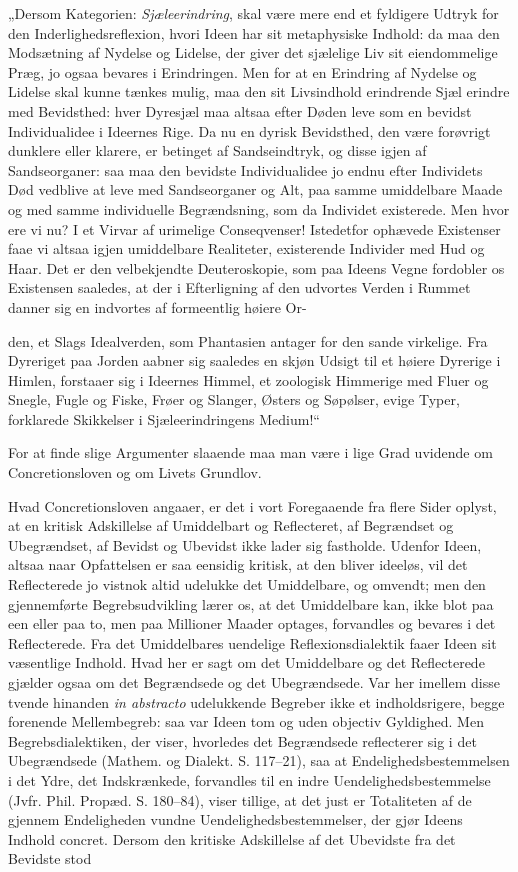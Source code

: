 \documentclass[12pt,a4paper]{book}
\begin{document}
„Dersom Kategorien: \emph{Sjæleerindring}, skal være mere end et fyldigere
Udtryk for den Inderlighedsreflexion, hvori Ideen har sit metaphysiske Indhold:
da maa den Modsætning af Nydelse og Lidelse, der giver det sjælelige Liv sit
eiendommelige Præg, jo ogsaa bevares i Erindringen. Men for at en Erindring af
Nydelse og Lidelse skal kunne tænkes mulig, maa den sit Livsindhold erindrende
Sjæl erindre med Bevidsthed: hver Dyresjæl maa altsaa efter Døden leve som en
bevidst Individualidee i Ideernes Rige. Da nu en dyrisk Bevidsthed, den være
forøvrigt dunklere eller klarere, er betinget af Sandseindtryk, og disse igjen
af Sandseorganer: saa maa den bevidste Individualidee jo endnu efter Individets
Død vedblive at leve med Sandseorganer og Alt, paa samme umiddelbare Maade og
med samme individuelle Begrændsning, som da Individet existerede. Men hvor ere
vi nu? I et Virvar af urimelige Conseqvenser! Istedetfor ophævede Existenser
faae vi altsaa igjen umiddelbare Realiteter, existerende Individer med Hud og
Haar. Det er den velbekjendte Deuteroskopie, som paa Ideens Vegne fordobler os
Existensen saaledes, at der i Efterligning af den udvortes Verden i Rummet
danner sig en indvortes af formeentlig høiere Or-

den, et Slags Idealverden, som Phantasien antager for den sande virkelige. Fra
Dyreriget paa Jorden aabner sig saaledes en skjøn Udsigt til et høiere Dyrerige
i Himlen, forstaaer sig i Ideernes Himmel, et zoologisk Himmerige med Fluer og
Snegle, Fugle og Fiske, Frøer og Slanger, Østers og Søpølser, evige Typer,
forklarede Skikkelser i Sjæleerindringens Medium!“

For at finde slige Argumenter slaaende maa man være i lige Grad uvidende om
Concretionsloven og om Livets Grundlov.

Hvad Concretionsloven angaaer, er det i vort Foregaaende fra flere Sider oplyst,
at en kritisk Adskillelse af Umiddelbart og Reflecteret, af Begrændset og
Ubegrændset, af Bevidst og Ubevidst ikke lader sig fastholde. Udenfor Ideen,
altsaa naar Opfattelsen er saa eensidig kritisk, at den bliver ideeløs, vil det
Reflecterede jo vistnok altid udelukke det Umiddelbare, og omvendt; men den
gjennemførte Begrebsudvikling lærer os, at det Umiddelbare kan, ikke blot paa
een eller paa to, men paa Millioner Maader optages, forvandles og bevares i det
Reflecterede. Fra det Umiddelbares uendelige Reflexionsdialektik faaer Ideen sit
væsentlige Indhold. Hvad her er sagt om det Umiddelbare og det Reflecterede
gjælder ogsaa om det Begrændsede og det Ubegrændsede. Var her imellem disse
tvende hinanden \textit{in abstracto} udelukkende Begreber ikke et
indholdsrigere, begge forenende Mellembegreb: saa var Ideen tom og uden objectiv
Gyldighed. Men Begrebsdialektiken, der viser, hvorledes det Begrændsede
reflecterer sig i det Ubegrændsede (Mathem. og Dialekt. S. 117--21), saa at
Endelighedsbestemmelsen i det Ydre, det Indskrænkede, forvandles til en indre
Uendelighedsbestemmelse (Jvfr. Phil. Propæd. S. 180--84), viser tillige, at det
just er Totaliteten af de gjennem Endeligheden vundne
Uendelighedsbestemmelser, der gjør Ideens Indhold concret. Dersom den kritiske
Adskillelse af det Ubevidste fra det Bevidste stod
\end{document}
